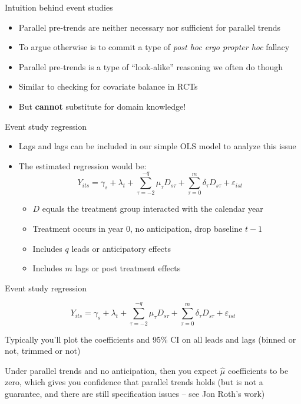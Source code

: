 \documentclass{beamer}
\begin{document}
\begin{frame}{Intuition behind event studies}

\begin{itemize}
\item Parallel pre-trends are neither necessary nor sufficient for parallel trends
\item To argue otherwise is to commit a type of \emph{post hoc ergo propter hoc} fallacy
\item Parallel pre-trends is a type of ``look-alike'' reasoning we often do though
\item Similar to checking for covariate balance in RCTs
\item But \textbf{cannot} substitute for domain knowledge!
\end{itemize}

\end{frame}



\begin{frame}{Event study regression}
	
	\begin{itemize}
	\item Lags and lags can be included in our simple OLS model to analyze this issue
	\item The estimated regression would be:$$Y_{its} = \gamma_s + \lambda_t + \sum_{\tau=-2}^{-q}\mu_{\tau}D_{s\tau} + \sum_{\tau=0}^m\delta_{\tau}D_{s\tau}+\varepsilon_{ist}$$
		\begin{itemize}
		\item $D$ equals the treatment group interacted with the calendar year
		\item Treatment occurs in year 0, no anticipation, drop baseline $t-1$
		\item Includes $q$ leads or anticipatory effects
		\item Includes $m$ lags or post treatment effects
		\end{itemize}
	\end{itemize}
\end{frame}

\begin{frame}{Event study regression}


$$Y_{its} = \gamma_s + \lambda_t + \sum_{\tau=-2}^{-q}\mu_{\tau}D_{s\tau} + \sum_{\tau=0}^m\delta_{\tau}D_{s\tau}+\varepsilon_{ist}$$

\bigskip

Typically you'll plot the coefficients and 95\% CI on all leads and lags (binned or not, trimmed or not) 

\bigskip

Under parallel trends and no anticipation, then you expect $\widehat{\mu}$ coefficients to be zero, which gives you confidence that parallel trends holds (but is not a guarantee, and there are still specification issues -- see Jon Roth's work)

\end{frame}
\end{document}
